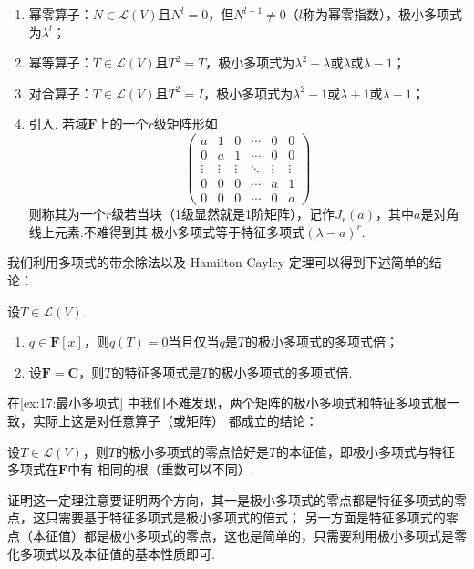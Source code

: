 \begin{enumerate}
    \item 幂零算子：$N\in \mathcal{L}(V)$且$N^l=0$，但$N^{l-1}\neq 0$（$l$称为幂零指数），极小多项式为$\lambda^l$；

    \item 幂等算子：$T\in \mathcal{L}(V)$且$T^2=T$，极小多项式为$\lambda^2-\lambda$或$\lambda$或$\lambda-1$；

    \item 对合算子：$T\in \mathcal{L}(V)$且$T^2=I$，极小多项式为$\lambda^2-1$或$\lambda+1$或$\lambda-1$；

    \item 引入. 若域$\mathbf{F}$上的一个$r$级矩阵形如\[\begin{pmatrix}
        a & 1 & 0 & \cdots & 0 & 0 \\
        0 & a & 1 & \cdots & 0 & 0 \\
        \vdots & \vdots & \vdots & \ddots & \vdots & \vdots \\
        0 & 0 & 0 & \cdots & a & 1 \\
        0 & 0 & 0 & \cdots & 0 & a
    \end{pmatrix}\]
    则称其为一个$r$级若当块（1级显然就是1阶矩阵），记作$J_r(a)$，其中$a$是对角线上元素.不难得到其
    极小多项式等于特征多项式$(\lambda-a)^r$.
\end{enumerate}

我们利用多项式的带余除法以及 Hamilton-Cayley 定理可以得到下述简单的结论：
\begin{theorem}
    设$T\in \mathcal{L}(V)$.
    \begin{enumerate}
        \item $q\in\mathbf{F}[x]$，则$q(T)=0$当且仅当$q$是$T$的极小多项式的多项式倍；

        \item 设$\mathbf{F}=\mathbf{C}$，则$T$的特征多项式是$T$的极小多项式的多项式倍.
    \end{enumerate}
\end{theorem}
在\autoref{ex:17:最小多项式} 中我们不难发现，两个矩阵的极小多项式和特征多项式根一致，实际上这是对任意算子（或矩阵）
都成立的结论：
\begin{theorem} \label{thm:17:极小多项式与特征多项式相同根}
    设$T\in \mathcal{L}(V)$，则$T$的极小多项式的零点恰好是$T$的本征值，即极小多项式与特征多项式在$\mathbf{F}$中有
    相同的根（重数可以不同）.
\end{theorem}
证明这一定理注意要证明两个方向，其一是极小多项式的零点都是特征多项式的零点，这只需要基于特征多项式是极小多项式的倍式；
另一方面是特征多项式的零点（本征值）都是极小多项式的零点，这也是简单的，只需要利用极小多项式是零化多项式以及本征值的基本性质即可.

